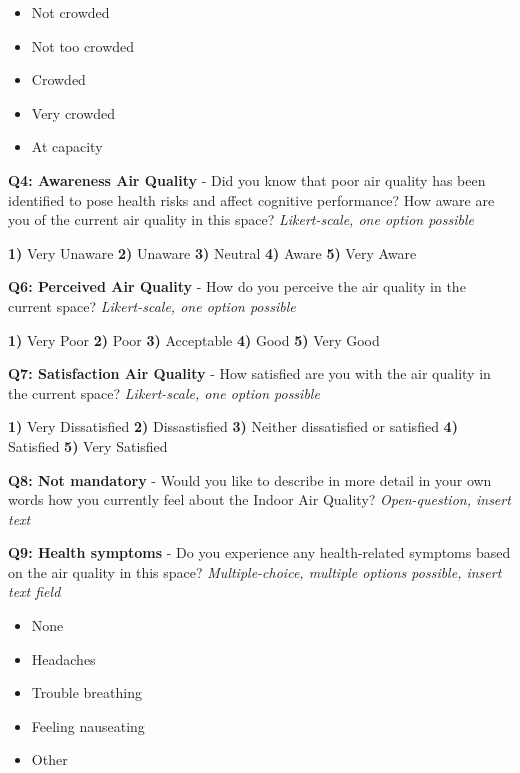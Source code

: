 \begin{appendices}
\begin{itemize}
    \item Not crowded
    \item Not too crowded
    \item Crowded
    \item Very crowded
    \item At capacity
\end{itemize}

\textbf{Q4: Awareness Air Quality} - Did you know that poor air quality has been identified to pose health risks and affect cognitive performance? How aware are you of the current air quality in this space? \textit{Likert-scale, one option possible}

\textbf{1)} Very Unaware \textbf{2)} Unaware \textbf{3)} Neutral \textbf{4)} Aware \textbf{5)} Very Aware

\vspace{10pt}

\textbf{Q6: Perceived Air Quality} - How do you perceive the air quality in the current space? \textit{Likert-scale, one option possible}

\textbf{1)} Very Poor \textbf{2)} Poor \textbf{3)} Acceptable \textbf{4)} Good \textbf{5)} Very Good 

\vspace{10pt}

\textbf{Q7: Satisfaction Air Quality} - How satisfied are you with the air quality in the current space? \textit{Likert-scale, one option possible}

\textbf{1)} Very Dissatisfied \textbf{2)} Dissastisfied \textbf{3)} Neither dissatisfied or satisfied \textbf{4)} Satisfied \textbf{5)} Very Satisfied

\vspace{10pt}

\textbf{Q8: Not mandatory} - Would you like to describe in more detail in your own words how you currently feel about the Indoor Air Quality? \textit{Open-question, insert text}

\vspace{10pt}

\textbf{Q9: Health symptoms} - Do you experience any health-related symptoms based on the air quality in this space? \textit{Multiple-choice, multiple options possible, insert text field}

\begin{itemize}
    \item None
    \item Headaches
    \item Trouble breathing
    \item Feeling nauseating
    \item Other
\end{itemize}


\end{appendices}
